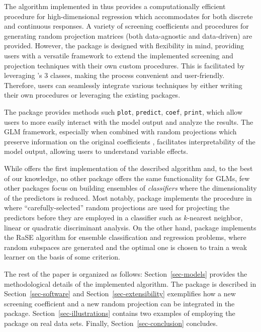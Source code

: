 \documentclass[
  article]{jss}
\begin{document}
The algorithm implemented in  thus provides a computationally
efficient procedure for high-dimensional regression which accommodates
for both discrete and continuous responses. A variety of screening
coefficients and procedures for generating random projection matrices
(both data-agnostic and data-driven) are provided. However, the package
is designed with flexibility in mind, providing users with a versatile
framework to extend the implemented screening and projection techniques
with their own custom procedures. This is facilitated by leveraging
's 3 classes, making the process convenient and
user-friendly. Therefore, users can seamlessly integrate various
techniques by either writing their own procedures or leveraging the
existing  packages.

The package provides methods such \texttt{plot}, \texttt{predict},
\texttt{coef}, \texttt{print}, which allow users to more easily interact
with the model output and analyze the results. The GLM framework,
especially when combined with random projections which preserve
information on the original coefficients \citep[such as the one
in][]{parzer2024glms}, facilitates interpretability of the model output,
allowing users to understand variable effects.

While  offers the first implementation of the described
algorithm and, to the best of our knowledge, no other package offers the
same functionality for GLMs, few other  packages focus on
building ensembles of \emph{classifiers} where the dimensionality of the
predictors is reduced. Most notably, package 
\citep{RPEnsembleR} implements the procedure in
\citet{cannings2017random} where ``carefully-selected'' random
projections are used for projecting the predictors before they are
employed in a classifier such as \(k\)-nearest neighbor, linear or
quadratic discriminant analysis. On the other hand, package 
\citep{pkg:RaSEn} implements the RaSE algorithm for ensemble
classification and regression problems, where random subspaces are
generated and the optimal one is chosen to train a weak learner on the
basis of some criterion.

The rest of the paper is organized as follows: Section~\ref{sec-models}
provides the methodological details of the implemented algorithm. The
package is described in Section~\ref{sec-software} and
Section~\ref{sec-extensibility} exemplifies how a new screening
coefficient and a new random projection can be integrated in the
package. Section~\ref{sec-illustrations} contains two examples of
employing the package on real data sets. Finally,
Section~\ref{sec-conclusion} concludes.
\end{document}
